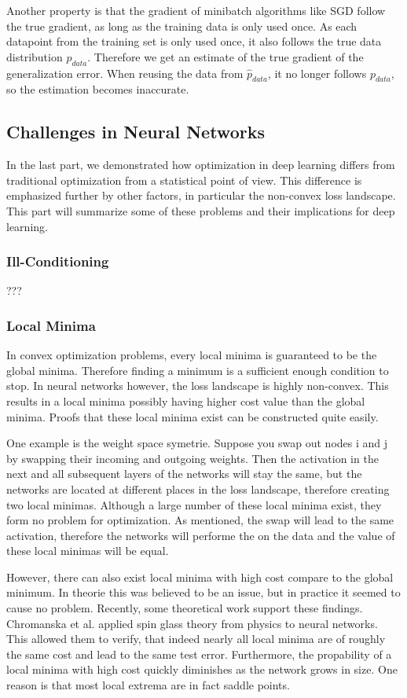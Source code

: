 Another property is that the gradient of minibatch algorithms like SGD follow
the true gradient, as long as the training data is only used once. As each
datapoint from the training set is only used once, it also follows the true data
distribution $p_{data}$. Therefore we get an estimate of the true gradient of
the generalization error. When reusing the data from $\hat{p}_{data}$, it no
longer follows $p_{data}$, so the estimation becomes inaccurate.

\subsection{Challenges in Neural Networks}
In the last part, we demonstrated how optimization in deep learning differs from
traditional optimization from a statistical point of view. This difference is
emphasized further by other factors, in particular the non-convex loss
landscape. This part will summarize some of these problems and their
implications for deep learning.

\subsubsection{Ill-Conditioning}???


\subsubsection{Local Minima}
In convex optimization problems, every local minima is guaranteed to be the
global minima. Therefore finding a minimum is a sufficient enough condition to stop. In
neural networks however, the loss landscape is highly non-convex. This results
in a local minima possibly having higher cost value than the global minima.
Proofs that these local minima exist can be constructed quite easily.

One example is the weight space symetrie. Suppose you swap out nodes i and j by
swapping their incoming and outgoing weights. Then the activation in the next
and all subsequent layers of the networks will stay the same, but the networks
are located at different places in the loss landscape, therefore creating two
local minimas. Although a large number of these local minima exist, they form no
problem for optimization. As mentioned, the swap will lead to the same
activation, therefore the networks will performe the on the data and the value
of these local minimas will be equal.

However, there can also exist local minima with high cost compare to the global
minimum. In theorie this was believed to be an issue, but in practice it seemed
to cause no problem. Recently, some theoretical work support these findings.
Chromanska et al. \cite{choromanska2015loss} applied spin glass theory from physics to neural
networks. This allowed them to verify, that indeed nearly all local minima are
of roughly the same cost and lead to the same test error. Furthermore, the
propability of a local minima with high cost quickly diminishes as the network
grows in size. One reason is that most local extrema are in fact saddle points.

